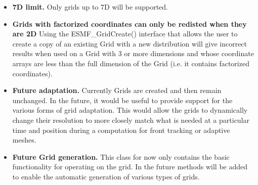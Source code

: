 

\begin{itemize}

\item {\bf 7D limit.}  Only grids up to 7D will be supported.

\item {\bf Grids with factorized coordinates can only be redisted when they are 2D}  Using the ESMF_GridCreate() interface that allows the user to create a copy of an existing Grid with a new distribution will give incorrect results when used on a Grid with 3 or more dimensions and whose coordinate arrays are less than the full dimension of the Grid (i.e. it contains factorized coordinates).

\item {\bf Future adaptation.}  Currently Grids
are created and then remain unchanged. In the future, it would
be useful to provide support for the various forms of grid
adaptation. This would allow the grids to dynamically change
their resolution to more closely match what is needed at a particular
time and position during a computation for front tracking or adaptive meshes.


\item {\bf Future Grid generation.} This class for now only contains
the basic functionality for operating on the grid. In the future
methods will be added to enable the automatic generation of various types of
grids. 


\end{itemize}

